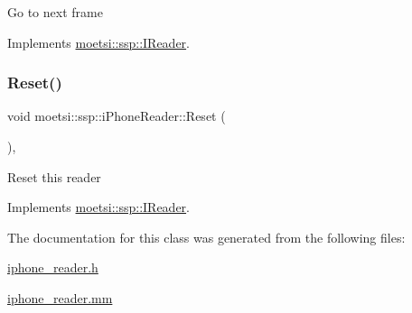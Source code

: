 Go to next frame 

Implements \hyperlink{classmoetsi_1_1ssp_1_1IReader_a49e82a786cca55248e27e7fac8f97a17}{moetsi\+::ssp\+::\+I\+Reader}.

\mbox{\label{classmoetsi_1_1ssp_1_1iPhoneReader_a3d78eacce7d71483da93efde29f47241}} 
\subsubsection{\texorpdfstring{Reset()}{Reset()}}
{\footnotesize\ttfamily void moetsi\+::ssp\+::i\+Phone\+Reader\+::\+Reset (\begin{DoxyParamCaption}{ }\end{DoxyParamCaption})\hspace{0.3cm}{\ttfamily [override]}, {\ttfamily [virtual]}}

Reset this reader 

Implements \hyperlink{classmoetsi_1_1ssp_1_1IReader_ad6e2ef78fc2466884aa877ecef54889d}{moetsi\+::ssp\+::\+I\+Reader}.



The documentation for this class was generated from the following files\+:\begin{DoxyCompactItemize}
\item 
\hyperlink{iphone__reader_8h}{iphone\+\_\+reader.\+h}\item 
\hyperlink{iphone__reader_8mm}{iphone\+\_\+reader.\+mm}\end{DoxyCompactItemize}
